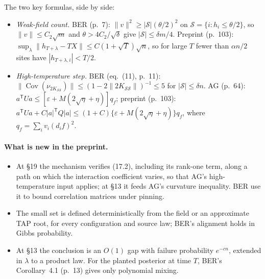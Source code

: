 \documentclass[11pt]{article}
\DeclareMathOperator{\Cov}{Cov}
\newcommand{\norm}[1]{\lVert #1\rVert}
\newcommand{\ploc}[2]{#1}
\begin{document}
The two key formulas, side by side:
\begin{itemize}
\item \emph{Weak-field count.} BER (p.~7): $\norm v^2\ge|\mathcal
 S|(\theta/2)^2$ on $\mathcal S=\{i:h_i\le\theta/2\}$, so $\norm v\le
 C_2\sqrt m$ and $\theta>4C_2/\sqrt\delta$ give $|\mathcal S|\le\delta m/4$.
 Preprint \ploc{(p.~103)}{profile-positive.tex:1660--1667}:
 $\sup_\lambda\norm{h_{T+\lambda}-TX}\le C(1+\sqrt T)\sqrt n$, so for large
 $T$ fewer than $\alpha n/2$ sites have $|h_{T+\lambda,i}|<T/2$.
\item \emph{High-temperature step.} BER (eq.~(11), p.~11):
 $\norm{\Cov(\nu_{2K_{\mathcal S\mathcal S}})}\le(1-2\norm{2K_{\mathcal
 S\mathcal S}})^{-1}\le5$ for $|\mathcal S|\le\delta n$. AG
 \ploc{(p.~64)}{terminal.tex:404--412}:
 $a^{\mathsf T}Ua\le[\varepsilon+M(2\sqrt\eta+\eta)]q_f$; preprint
 \ploc{(p.~103)}{profile-positive.tex:1679--1681}:
 $a^{\mathsf T}Ua+C|a|^{\mathsf T}Q|a|\le(1+C)\{\varepsilon+M(2\sqrt\eta+\eta)\}q_f$,
 where $q_f=\sum_iv_i(d_if)^2$.
\end{itemize}

\paragraph{What is new in the preprint.}
\begin{itemize}
\item At \S19 the mechanism verifies (17.2), including its rank-one term,
 along a path on which the interaction coefficient varies, so that AG's
 high-temperature input applies; at \S13 it feeds AG's curvature inequality.
 BER use it to bound correlation matrices under pinning.
\item The small set is defined deterministically from the field or an
 approximate TAP root, for every configuration and source law; BER's
 alignment holds in Gibbs probability.
\item At \S13 the conclusion is an $O(1)$ gap with failure probability
 $e^{-cn}$, extended in $\lambda$ to a product law. For the planted
 posterior at time $T$, BER's Corollary~4.1 (p.~13) gives only polynomial
 mixing.
\end{itemize}
\end{document}
